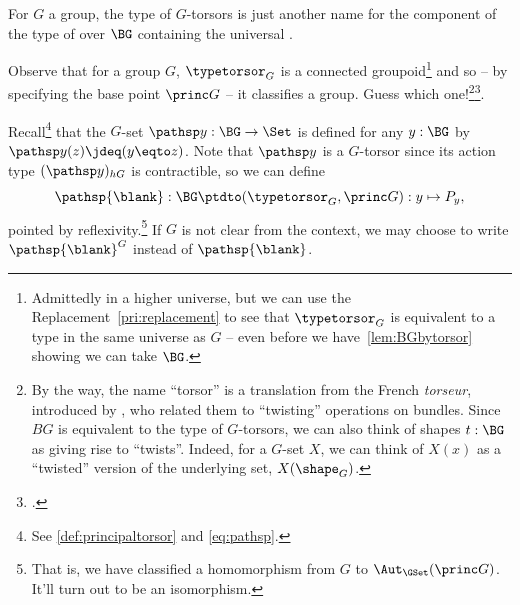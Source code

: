 \begin{remark}
  For $G$ a group, the type of $G$-torsors is just another name for the component of the type of \coverings over $\BG$ containing the universal \covering.

  Observe that for a group $G$, $\typetorsor_G$ is a connected groupoid\footnote{Admittedly in a higher universe, but we can use the
    Replacement~\cref{pri:replacement} to see that $\typetorsor_G$ is equivalent
    to a type in the same universe as $G$ -- even before we
    have~\cref{lem:BGbytorsor} showing we can take $\BG$.}
  and so -- by specifying the base point $\princ G$ -- it classifies a group.
  Guess which one!\footnote{%
    By the way, the name ``torsor'' is a translation from the French \emph{torseur},
    introduced by \citeauthor{giraud1971},\footnotemark{} who
    related them to “twisting” operations on bundles.
    Since $BG$ is equivalent to the type of $G$-torsors,
    we can also think of shapes $t:\BG$ as giving rise to “twists”.
    Indeed, for a $G$-set $X$,
    we can think of $X(x)$ as a ``twisted'' version of the underlying set,
    $X(\sh_G)$.}\footcitetext{giraud1971}.
\end{remark}


\begin{definition}
  \label{def:BG2TorsG}
  Recall\footnote{See \cref{def:principaltorsor} and \cref{eq:pathsp}.} that the
  $G$-set $\pathsp y:\BG\to\Set$ is defined for any $y:\BG$ by
  $\pathsp y(z)\jdeq(y\eqto z)$.  Note that $\pathsp y$ is a $G$-torsor since
  its action type $(\pathsp y)_{hG}$ is contractible, so we can define
  \[
    \pathsp{\blank}:\BG\ptdto(\typetorsor_G,\princ G): y\mapsto P_y,
  \]
  pointed by reflexivity.\footnote{%
    That is, we have classified a homomorphism from $G$
    to $\Aut_{\GSet}(\princ G)$. It'll turn out to be an isomorphism.}
If $G$ is not clear from the context, 
we may choose to write $\pathsp{\blank}^G$ instead of $\pathsp{\blank}$.
\end{definition}

